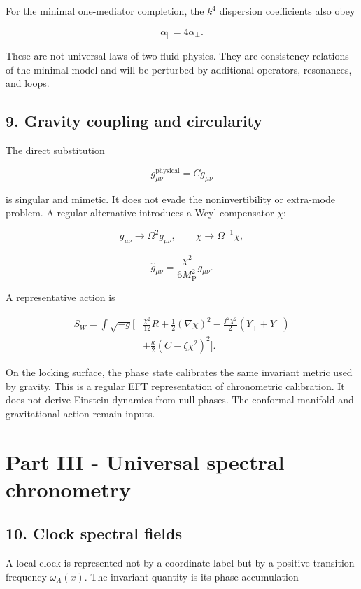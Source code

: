 \documentclass[
]{article}
\begin{document}
For the minimal one-mediator completion, the \(k^4\) dispersion
coefficients also obey

\[
\boxed{\alpha_\parallel=4\alpha_\perp.}
\]

These are not universal laws of two-fluid physics. They are consistency
relations of the minimal model and will be perturbed by additional
operators, resonances, and loops.

\subsection{9. Gravity coupling and
circularity}\label{gravity-coupling-and-circularity}

The direct substitution

\[
g^{\mathrm{physical}}_{\mu\nu}=Cg_{\mu\nu}
\]

is singular and mimetic. It does not evade the noninvertibility or
extra-mode problem. A regular alternative introduces a Weyl compensator
\(\chi\):

\[
g_{\mu\nu}\rightarrow\Omega^2g_{\mu\nu},
\qquad
\chi\rightarrow\Omega^{-1}\chi,
\]

\[
\widehat g_{\mu\nu}
=\frac{\chi^2}{6M_{\mathrm{P}}^2}g_{\mu\nu}.
\]

A representative action is

\[
\begin{aligned}
S_W=\int\sqrt{-g}\Big[&
\frac{\chi^2}{12}R
+\frac12(\nabla\chi)^2
-\frac{f^2\chi^2}{2}(Y_++Y_-)\\
&+\frac\kappa2(C-\zeta\chi^2)^2
\Big].
\end{aligned}
\]

On the locking surface, the phase state calibrates the same invariant
metric used by gravity. This is a regular EFT representation of
chronometric calibration. It does not derive Einstein dynamics from null
phases. The conformal manifold and gravitational action remain inputs.

\section{Part III - Universal spectral
chronometry}\label{part-iii---universal-spectral-chronometry}

\subsection{10. Clock spectral fields}\label{clock-spectral-fields}

A local clock is represented not by a coordinate label but by a positive
transition frequency \(\omega_A(x)\). The invariant quantity is its
phase accumulation
\end{document}
